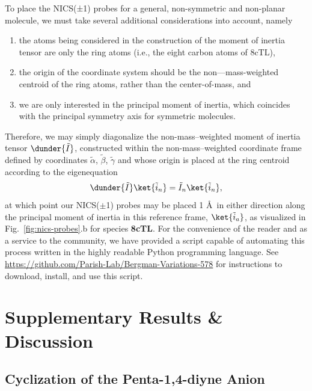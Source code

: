 \documentclass[aip,jcp,preprint,superscriptaddress,floatfix]{revtex4-1}
\begin{document}
To place the NICS(±1) probes for a general, non-symmetric and non-planar
molecule, we must take several additional considerations into account, namely 
\begin{enumerate}
\item the atoms being considered in the construction of the moment of inertia
tensor are only the ring atoms (i.e., the eight carbon atoms of 8cTL),
\item the origin of the coordinate system should be the non—mass-weighted
centroid of the ring atoms, rather than the center-of-mass, and
\item we are only interested in the principal moment of inertia, which
coincides with the principal symmetry axis for symmetric molecules.
\end{enumerate}
Therefore, we may simply diagonalize the non-mass--weighted moment of inertia
tensor $\dunder{\tilde{I}}$, constructed within the non-mass--weighted
coordinate frame defined by coordinates $\tilde{\alpha}$, $\tilde{\beta}$,
$\tilde{\gamma}$ and whose origin is placed at the ring centroid according to
the eigenequation
\begin{equation}
\dunder{\tilde{I}}\ket{\tilde{i}_n} = \tilde{I}_n\ket{\tilde{i}_n},
\end{equation}
at which point our NICS($\pm$1) probes may be placed 1 \AA\ in either direction
along the principal moment of inertia in this reference frame,
$\ket{\tilde{i}_a}$, as visualized in Fig.~\ref{fig:nics-probes}.b for species
{\bf 8cTL}. For the convenience of the reader and as a service to the
community, we have provided a script capable of automating this process written
in the highly readable Python programming language.  See
\url{https://github.com/Parish-Lab/Bergman-Variations-578} for instructions to
download, install, and use this script.



\section{Supplementary Results \& Discussion\label{sec:results}}

\subsection{Cyclization of the Penta-1,4-diyne Anion\label{subsec:5mem}}
\end{document}

